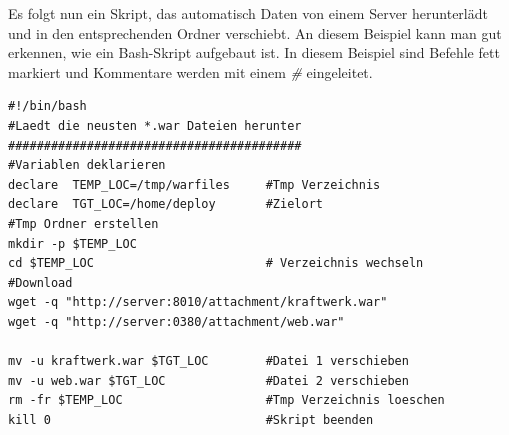 Es folgt nun ein Skript, das automatisch Daten von einem Server herunterlädt und in den entsprechenden Ordner verschiebt. An diesem Beispiel kann man gut erkennen, wie ein \acs{Bash}-Skript aufgebaut ist. In diesem Beispiel sind Befehle fett markiert und Kommentare werden mit einem \textit{\#} eingeleitet.
\begin{lstlisting}
#!/bin/bash
#Laedt die neusten *.war Dateien herunter
#########################################
#Variablen deklarieren
declare  TEMP_LOC=/tmp/warfiles		#Tmp Verzeichnis
declare  TGT_LOC=/home/deploy		#Zielort
#Tmp Ordner erstellen
mkdir -p $TEMP_LOC
cd $TEMP_LOC						# Verzeichnis wechseln
#Download
wget -q "http://server:8010/attachment/kraftwerk.war" 
wget -q "http://server:0380/attachment/web.war" 

mv -u kraftwerk.war $TGT_LOC 		#Datei 1 verschieben
mv -u web.war $TGT_LOC			    #Datei 2 verschieben
rm -fr $TEMP_LOC		            #Tmp Verzeichnis loeschen
kill 0		                        #Skript beenden
\end{lstlisting}

